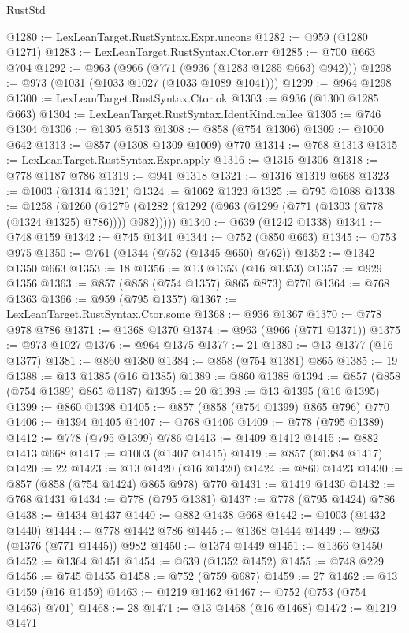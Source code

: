 \begin{lexlean}{RustStd}
\begin{coremodule}
@1280 := LexLeanTarget.RustSyntax.Expr.uncons
@1282 := @959 (@1280 @1271)
@1283 := LexLeanTarget.RustSyntax.Ctor.err
@1285 := @700 @663 @704
@1292 := @963 (@966 (@771 (@936 (@1283 @1285 @663) @942)))
@1298 := @973 (@1031 (@1033 @1027 (@1033 @1089 @1041)))
@1299 := @964 @1298
@1300 := LexLeanTarget.RustSyntax.Ctor.ok
@1303 := @936 (@1300 @1285 @663)
@1304 := LexLeanTarget.RustSyntax.IdentKind.callee
@1305 := @746 @1304
@1306 := @1305 @513
@1308 := @858 (@754 @1306)
@1309 := @1000 @642
@1313 := @857 (@1308 @1309 @1009) @770
@1314 := @768 @1313
@1315 := LexLeanTarget.RustSyntax.Expr.apply
@1316 := @1315 @1306
@1318 := @778 @1187 @786
@1319 := @941 @1318
@1321 := @1316 @1319 @668
@1323 := @1003 (@1314 @1321)
@1324 := @1062 @1323
@1325 := @795 @1088
@1338 := @1258
    (@1260 (@1279 (@1282 (@1292 (@963 (@1299 (@771 (@1303 (@778 (@1324 @1325) @786)))) @982)))))
@1340 := @639 (@1242 @1338)
@1341 := @748 @159
@1342 := @745 @1341
@1344 := @752 (@850 @663)
@1345 := @753 @975
@1350 := @761 (@1344 (@752 (@1345 @650) @762))
@1352 := @1342 @1350 @663
@1353 := 18
@1356 := @13 @1353 (@16 @1353)
@1357 := @929 @1356
@1363 := @857 (@858 (@754 @1357) @865 @873) @770
@1364 := @768 @1363
@1366 := @959 (@795 @1357)
@1367 := LexLeanTarget.RustSyntax.Ctor.some
@1368 := @936 @1367
@1370 := @778 @978 @786
@1371 := @1368 @1370
@1374 := @963 (@966 (@771 @1371))
@1375 := @973 @1027
@1376 := @964 @1375
@1377 := 21
@1380 := @13 @1377 (@16 @1377)
@1381 := @860 @1380
@1384 := @858 (@754 @1381) @865
@1385 := 19
@1388 := @13 @1385 (@16 @1385)
@1389 := @860 @1388
@1394 := @857 (@858 (@754 @1389) @865 @1187)
@1395 := 20
@1398 := @13 @1395 (@16 @1395)
@1399 := @860 @1398
@1405 := @857 (@858 (@754 @1399) @865 @796) @770
@1406 := @1394 @1405
@1407 := @768 @1406
@1409 := @778 (@795 @1389)
@1412 := @778 (@795 @1399) @786
@1413 := @1409 @1412
@1415 := @882 @1413 @668
@1417 := @1003 (@1407 @1415)
@1419 := @857 (@1384 @1417)
@1420 := 22
@1423 := @13 @1420 (@16 @1420)
@1424 := @860 @1423
@1430 := @857 (@858 (@754 @1424) @865 @978) @770
@1431 := @1419 @1430
@1432 := @768 @1431
@1434 := @778 (@795 @1381)
@1437 := @778 (@795 @1424) @786
@1438 := @1434 @1437
@1440 := @882 @1438 @668
@1442 := @1003 (@1432 @1440)
@1444 := @778 @1442 @786
@1445 := @1368 @1444
@1449 := @963 (@1376 (@771 @1445)) @982
@1450 := @1374 @1449
@1451 := @1366 @1450
@1452 := @1364 @1451
@1454 := @639 (@1352 @1452)
@1455 := @748 @229
@1456 := @745 @1455
@1458 := @752 (@759 @687)
@1459 := 27
@1462 := @13 @1459 (@16 @1459)
@1463 := @1219 @1462
@1467 := @752 (@753 (@754 @1463) @701)
@1468 := 28
@1471 := @13 @1468 (@16 @1468)
@1472 := @1219 @1471

\end{coremodule}
\end{lexlean}
